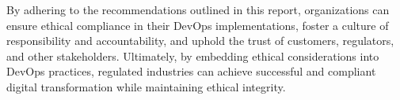 By adhering to the recommendations outlined in this report, organizations can ensure ethical compliance in their DevOps implementations, foster a culture of responsibility and accountability, and uphold the trust of customers, regulators, and other stakeholders. Ultimately, by embedding ethical considerations into DevOps practices, regulated industries can achieve successful and compliant digital transformation while maintaining ethical integrity.


   


